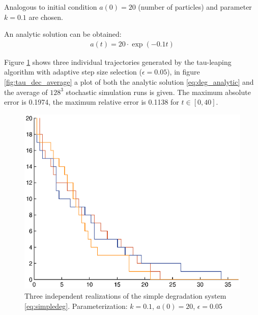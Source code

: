 Analogous to \cite{erban_practical_2007} initial condition $a(0) = 20$ (number of particles) and parameter $k = 0.1$ are chosen. 

An analytic solution can be obtained:
\begin{align}
a(t) = 20 \cdot \exp(-0.1t)
\end{align}

Figure \ref{fig:tau_dec_indiv} shows three individual trajectories generated by the tau-leaping algorithm with adaptive step size selection ($\epsilon = 0.05$), in figure \ref{fig:tau_dec_average} a plot of both the analytic solution \eqref{eq:deg_analytic} and the average of $128^3$ stochastic simulation runs is given. The maximum absolute error is 0.1974, the maximum relative error is 0.1138 for $t \in [0,40]$. 

\begin{figure}
\centering
\includegraphics[width=\textwidth]{images/tau_decaying_individual.eps}
\caption{Three independent realizations of the simple degradation system \eqref{eq:simpledeg}. Parameterization: $k = 0.1$, $a(0) = 20$, $\epsilon = 0.05$}
\label{fig:tau_dec_indiv}
\end{figure}

